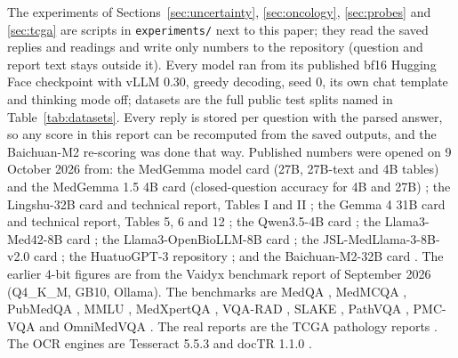 \documentclass{article}
\begin{document}
The experiments of Sections~\ref{sec:uncertainty}, \ref{sec:oncology}, \ref{sec:probes} and \ref{sec:tcga} are scripts in \texttt{experiments/} next to this paper; they read the saved replies and readings and write only numbers to the repository (question and report text stays outside it). Every model ran from its published bf16 Hugging Face checkpoint with vLLM 0.30, greedy decoding, seed 0, its own chat template and thinking mode off; datasets are the full public test splits named in Table~\ref{tab:datasets}. Every reply is stored per question with the parsed answer, so any score in this report can be recomputed from the saved outputs, and the Baichuan-M2 re-scoring was done that way. Published numbers were opened on 9 October 2026 from: the MedGemma model card (27B, 27B-text and 4B tables) and the MedGemma 1.5 4B card (closed-question accuracy for 4B and 27B) \citep{sellergren2025medgemma}; the Lingshu-32B card and technical report, Tables I and II \citep{xu2025lingshu}; the Gemma 4 31B card and technical report, Tables 5, 6 and 12 \citep{gemma4}; the Qwen3.5-4B card \citep{qwen35}; the Llama3-Med42-8B card \citep{christophe2024med42}; the Llama3-OpenBioLLM-8B card \citep{openbiollm}; the JSL-MedLlama-3-8B-v2.0 card \citep{jslmedllama}; the HuatuoGPT-3 repository \citep{huatuogpt3}; and the Baichuan-M2-32B card \citep{baichuanm2}. The earlier 4-bit figures are from the Vaidyx benchmark report of September 2026 (Q4\_K\_M, GB10, Ollama). The benchmarks are MedQA \citep{jin2021medqa}, MedMCQA \citep{pal2022medmcqa}, PubMedQA \citep{jin2019pubmedqa}, MMLU \citep{hendrycks2021mmlu}, MedXpertQA \citep{zuo2025medxpertqa}, VQA-RAD \citep{lau2018vqarad}, SLAKE \citep{liu2021slake}, PathVQA \citep{he2020pathvqa}, PMC-VQA \citep{zhang2023pmcvqa} and OmniMedVQA \citep{hu2024omnimedvqa}. The real reports are the TCGA pathology reports \citep{kefeli2024tcga}. The OCR engines are Tesseract 5.5.3 \citep{smith2007tesseract} and docTR 1.1.0 \citep{doctr}.



\end{document}
